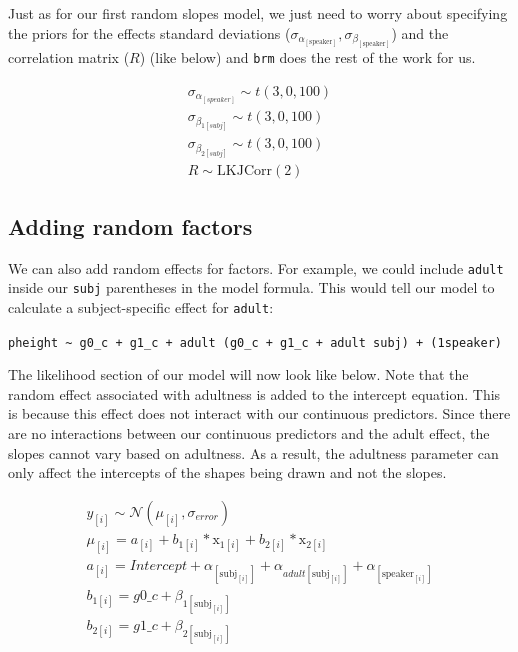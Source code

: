 \documentclass[
]{book}
\begin{document}
Just as for our first random slopes model, we just need to worry about specifying the priors for the effects standard deviations (\(\sigma_{\alpha_{[\mathrm{speaker}]}}, \sigma_{\beta_{[\mathrm{speaker}]}}\)) and the correlation matrix (\(R\)) (like below) and \texttt{brm} does the rest of the work for us.

\begin{equation}
\begin{split}
\sigma_{\alpha_{[speaker]}} \sim t(3, 0, 100) \\ 
\sigma_{\beta_{1[subj]}} \sim t(3, 0, 100) \\ 
\sigma_{\beta_{2[subj]}} \sim t(3, 0, 100) \\ 
R \sim \mathrm{LKJCorr} (2)
\end{split}
\label{eq:614}
\end{equation}

\hypertarget{adding-random-factors}{%
\subsection{Adding random factors}\label{adding-random-factors}}

We can also add random effects for factors. For example, we could include \texttt{adult} inside our \texttt{subj} parentheses in the model formula. This would tell our model to calculate a subject-specific effect for \texttt{adult}:

\texttt{pheight\ \textasciitilde{}\ g0\_c\ +\ g1\_c\ +\ adult\ (g0\_c\ +\ g1\_c\ +\ adult\ \textbar{}subj)\ +\ (1\textbar{}speaker)}

The likelihood section of our model will now look like below. Note that the random effect associated with adultness is added to the intercept equation. This is because this effect does not interact with our continuous predictors. Since there are no interactions between our continuous predictors and the adult effect, the slopes cannot vary based on adultness. As a result, the adultness parameter can only affect the intercepts of the shapes being drawn and not the slopes.

\begin{equation}
\begin{split}
y_{[i]} \sim \mathcal{N}(\mu_{[i]},\sigma_{error}) \\
\mu_{[i]} = a_{[i]} + b_{1[i]} * \mathrm{x}_{1[i]} + b_{2[i]} * \mathrm{x}_{2[i]}  \\ 
a_{[i]} = Intercept + \alpha_{[\mathrm{subj}_{[i]}]} + \alpha_{adult[\mathrm{subj}_{[i]}]} + \alpha_{[\mathrm{speaker}_{[i]}]}  \\
b_{1[i]} =  g0\_c + \beta_{1{[\mathrm{subj}_{[i]}]}} \\ 
b_{2[i]} =  g1\_c + \beta_{2{[\mathrm{subj}_{[i]}]}} \\ \\
\end{split}
\label{eq:614}
\end{equation}
\end{document}
